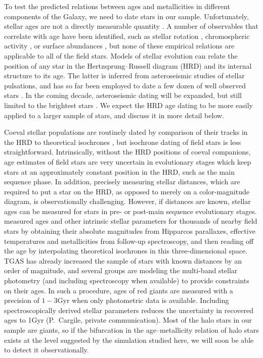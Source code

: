 \documentclass[apj, twocolappendix, numberedappendix, appendixfloats]{emulateapj}
\begin{document}
To test the predicted relations between ages and metallicities in different components of the Galaxy, we need to date stars in our sample.
Unfortunately, stellar ages are not a directly measurable quantity \citep[for a recent review, see][]{soderblom2010}.
A number of observables that correlate with age have been identified, such as stellar rotation \citep{barnes2007}, chromospheric activity \citep{mamajek2008}, or surface abundances \citep{ness2016}, but none of these empirical relations are applicable to all of the field stars.
Models of stellar evolution can relate the position of any star in the Hertzsprung--Russell diagram (HRD) and its internal structure to its age.
The latter is inferred from asteroseismic studies of stellar pulsations, and has so far been employed to date a few dozen of well observed stars \citep[e.g.,][]{keplerages}.
In the coming decade, asteroseismic dating will be expanded, but still limited to the brightest stars \citep{tess, plato}.
We expect the HRD age dating to be more easily applied to a larger sample of stars, and discuss it in more detail below.

Coeval stellar populations are routinely dated by comparison of their tracks in the HRD to theoretical isochrones \citep[e.g.,][]{sandage1970, chaboyer1998, dotter2007}, but isochrone dating of field stars is less straightforward.
Intrinsically, without the HRD positions of coeval companions, age estimates of field stars are very uncertain in evolutionary stages which keep stars at an approximately constant position in the HRD, such as the main sequence phase.
In addition, precisely measuring stellar distances, which are required to put a star on the HRD, as opposed to merely on a color-magnitude diagram, is observationally challenging.
However, if distances are known, stellar ages can be measured for stars in pre- or post-main sequence evolutionary stages.
\citet{gcs} measured ages and other intrinsic stellar parameters for thousands of nearby field stars by obtaining their absolute magnitudes from Hipparcos parallaxes, effective temperatures and metallicities from follow-up spectroscopy, and then reading off the age by interpolating theoretical isochrones in this three-dimensional space.
TGAS has already increased the sample of stars with known distances by an order of magnitude, and several groups are modeling the multi-band stellar photometry (and including spectroscopy when available) to provide constraints on their ages.
In such a procedure, ages of red giants are measured with a precision of $1-3$\;Gyr when only photometric data is available.
Including spectroscopically derived stellar parameters reduces the uncertainty in recovered ages to 1\;Gyr (P.~Cargile, private communication).
Most of the halo stars in our sample are giants, so if the bifurcation in the age--metallicity relation of halo stars exists at the level suggested by the simulation studied here, we will soon be able to detect it observationally.
\end{document}
